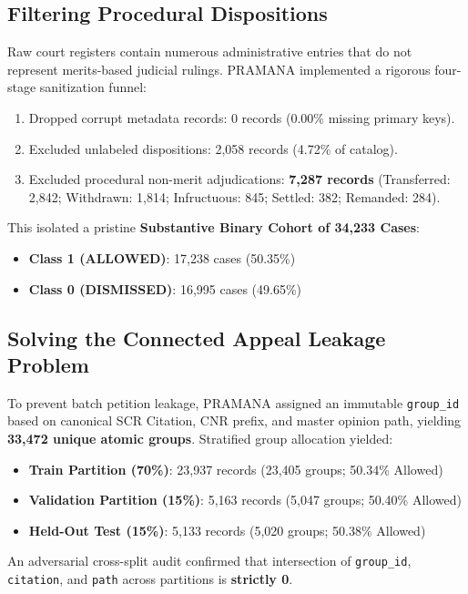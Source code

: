 \documentclass[journal,10pt,twocolumn]{IEEEtran}
\begin{document}
\subsection{Filtering Procedural Dispositions}
Raw court registers contain numerous administrative entries that do not represent merits-based judicial rulings. PRAMANA implemented a rigorous four-stage sanitization funnel:
\begin{enumerate}
    \item Dropped corrupt metadata records: 0 records (0.00\% missing primary keys).
    \item Excluded unlabeled dispositions: 2,058 records (4.72\% of catalog).
    \item Excluded procedural non-merit adjudications: \textbf{7,287 records} (Transferred: 2,842; Withdrawn: 1,814; Infructuous: 845; Settled: 382; Remanded: 284).
\end{enumerate}

This isolated a pristine \textbf{Substantive Binary Cohort of 34,233 Cases}:
\begin{itemize}
    \item \textbf{Class 1 (ALLOWED)}: 17,238 cases (50.35\%)
    \item \textbf{Class 0 (DISMISSED)}: 16,995 cases (49.65\%)
\end{itemize}

\subsection{Solving the Connected Appeal Leakage Problem}
To prevent batch petition leakage, PRAMANA assigned an immutable \texttt{group\_id} based on canonical SCR Citation, CNR prefix, and master opinion path, yielding \textbf{33,472 unique atomic groups}. Stratified group allocation yielded:
\begin{itemize}
    \item \textbf{Train Partition (70\%)}: 23,937 records (23,405 groups; 50.34\% Allowed)
    \item \textbf{Validation Partition (15\%)}: 5,163 records (5,047 groups; 50.40\% Allowed)
    \item \textbf{Held-Out Test (15\%)}: 5,133 records (5,020 groups; 50.38\% Allowed)
\end{itemize}

An adversarial cross-split audit confirmed that intersection of \texttt{group\_id}, \texttt{citation}, and \texttt{path} across partitions is \textbf{strictly 0}.
\end{document}

